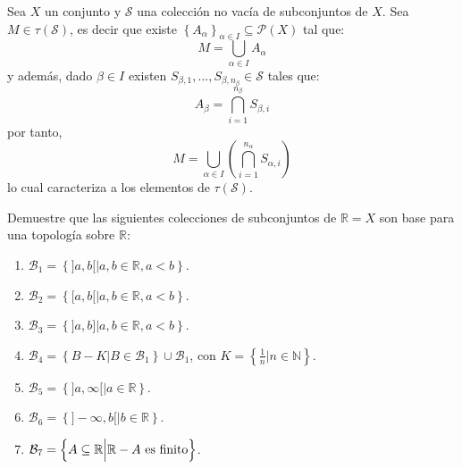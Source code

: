 \documentclass[12pt]{report}
\theoremstyle{largebreak}
\begin{document}
    \begin{obs}
        Sea $X$ un conjunto y $\mathcal{S}$ una colección no vacía de subconjuntos de $X$. Sea $M\in\tau(\mathcal{S})$, es decir que existe $\left\{A_\alpha \right\}_{\alpha\in I } \subseteq\mathcal{P}(X)$ tal que:
        \begin{equation*}
            M=\bigcup_{\alpha\in I}A_\alpha
        \end{equation*}
        y además, dado $\beta\in I$ existen $S_{\beta,1},...,S_{\beta,n_\beta}\in\mathcal{S}$ tales que:
        \begin{equation*}
            A_\beta=\bigcap_{i=1 }^{n_\beta }S_{\beta,i}
        \end{equation*}
        por tanto,
        \begin{equation*}
            M=\bigcup_{\alpha\in I}\left(\bigcap_{i=1 }^{n_\alpha }S_{\alpha,i} \right)
        \end{equation*}
        lo cual caracteriza a los elementos de $\tau(\mathcal{S})$.
    \end{obs}

    \begin{excer}
        Demuestre que las siguientes colecciones de subconjuntos de $\mathbb{R}=X$ son base para una topología sobre $\mathbb{R}$:
        \begin{enumerate}
            \item $\mathcal{B}_1=\left\{]a,b[\Big|a,b\in\mathbb{R},a<b \right\}$.
            \item $\mathcal{B}_2=\left\{[a,b[\Big|a,b\in\mathbb{R},a<b \right\}$.
            \item $\mathcal{B}_3=\left\{]a,b]\Big|a,b\in\mathbb{R},a<b \right\}$.
            \item  $\mathcal{B}_4=\left\{B-K \Big|B\in\mathcal{B}_1 \right\}\cup\mathcal{B}_1$, con $K=\left\{\frac{1}{n}\Big|n\in\mathbb{N} \right\}$.
            \item $\mathcal{B}_5=\left\{]a,\infty[\Big|a\in\mathbb{R}\right\}$.
            \item $\mathcal{B}_6=\left\{]-\infty,b[\Big|b\in\mathbb{R} \right\}$.
            \item $\mathcal{B}_7=\left\{A\subseteq\mathbb{R}\Big| \mathbb{R}-A\textup{ es finito} \right\}$.
        \end{enumerate}
    \end{excer}
\end{document}
